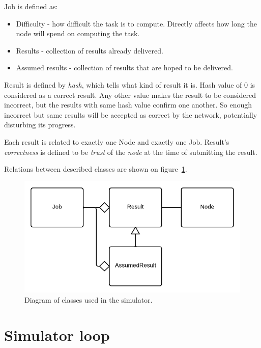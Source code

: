 Job is defined as:
\begin{itemize}
\item Difficulty - how difficult the task is to compute. Directly affects how long the node will spend on computing the task.
\item Results - collection of results already delivered.
\item Assumed results - collection of results that are hoped to be delivered.
\end{itemize}

Result is defined by \emph{hash}, which tells what kind of result it is. Hash value of 0 is considered as a correct result. Any other value makes the result to be considered incorrect, but the results with same hash value confirm one another. So enough incorrect but same results will be accepted as correct by the network, potentially disturbing its progress.

Each result is related to exactly one Node and exactly one Job. Result's \emph{correctness} is defined to be \emph{trust} of the \emph{node} at the time of submitting the result.

Relations between described classes are shown on figure~\ref{f:simclassdg}.

\begin{figure}
\centering
\includegraphics{diagrams/SimulatorClassDiagram.pdf}
\caption{Diagram of classes used in the simulator.}
\label{f:simclassdg}
\end{figure}

\section{Simulator loop}

